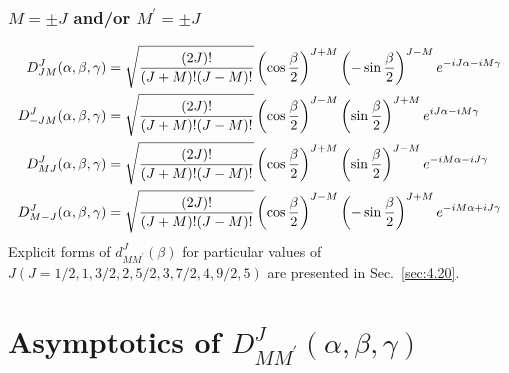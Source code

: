 \subsubsection{ $M= \pm J$ and/or $M^{\prime}= \pm J$}
\begin{align}
D_{J M}^{J}(\alpha, \beta, \gamma) & =\sqrt{\frac{(2 J)!}{(J+M)!(J-M)!}}\left(\cos \frac{\beta}{2}\right)^{J+M}\left(-\sin \frac{\beta}{2}\right)^{J-M} e^{-i J \alpha-i M \gamma}  \notag\\
D_{-J M}^{J}(\alpha, \beta, \gamma) & =\sqrt{\frac{(2 J)!}{(J+M)!(J-M)!}}\left(\cos \frac{\beta}{2}\right)^{J-M}\left(\sin \frac{\beta}{2}\right)^{J+M} e^{i J \alpha-i M \gamma}  \notag\\
D_{M J}^{J}(\alpha, \beta, \gamma) & =\sqrt{\frac{(2 J)!}{(J+M)!(J-M)!}}\left(\cos \frac{\beta}{2}\right)^{J+M}\left(\sin \frac{\beta}{2}\right)^{J-M} e^{-i M \alpha-i J \gamma}  \label{eq:4:17:8}\\
D_{M-J}^{J}(\alpha, \beta, \gamma) & =\sqrt{\frac{(2 J)!}{(J+M)!(J-M)!}}\left(\cos \frac{\beta}{2}\right)^{J-M}\left(-\sin \frac{\beta}{2}\right)^{J+M} e^{-i M \alpha+i J \gamma} \notag
\end{align}
Explicit forms of $d_{M M^{\prime}}^{J}(\beta)$ for particular values of $J(J=1 / 2,1,3 / 2,2,5 / 2,3,7 / 2,4,9 / 2,5)$ are presented in Sec.~\ref{sec:4.20}.

\section{Asymptotics of $D_{M M^{\prime}}^{J}(\alpha, \beta, \gamma)$}\label{sec:4.18}
